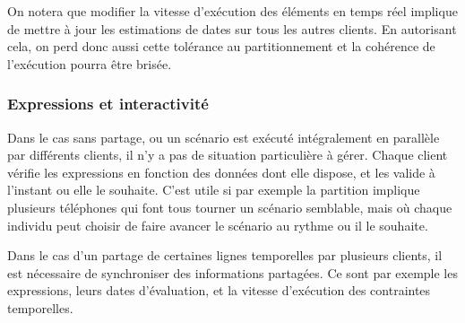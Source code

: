 \documentclass{article}
\begin{document}
On notera que modifier la vitesse d'exécution des éléments en temps réel implique de mettre à jour les estimations de dates sur tous les autres clients. 
En autorisant cela, on perd donc aussi cette tolérance au partitionnement et la cohérence de l'exécution pourra être brisée.

\begin{figure}[h]
	\centering
	\begin{tikzpicture}
	
	\end{tikzpicture}
	\label{scenar.non-interactif}
\end{figure}


\subsubsection{Expressions et interactivité}
\label{section.expr-interact}
Dans le cas sans partage, ou un scénario est exécuté intégralement en parallèle par différents clients, il n'y a pas de situation particulière à gérer.
Chaque client vérifie les expressions en fonction des données dont elle dispose, et les valide à l'instant ou elle le souhaite. 
C'est utile si par exemple la partition implique plusieurs téléphones qui font tous tourner un scénario semblable, mais où chaque individu peut choisir de faire avancer le scénario au rythme ou il le souhaite.

Dans le cas d'un partage de certaines lignes temporelles par plusieurs clients, il est nécessaire de synchroniser des informations partagées.
Ce sont par exemple les expressions, leurs dates d'évaluation, et la vitesse d'exécution des contraintes temporelles.
\end{document}

